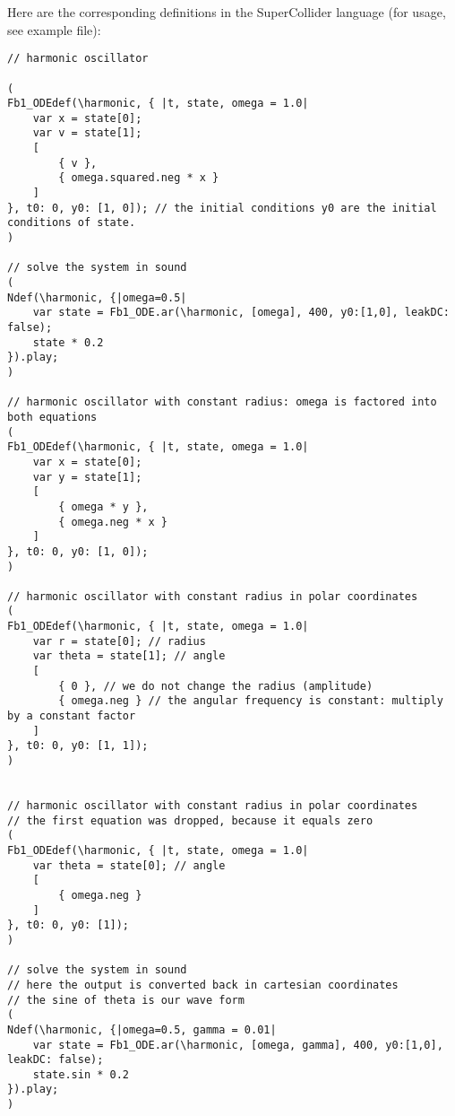 \documentclass{article}
\begin{document}
Here are the corresponding definitions in the SuperCollider language (for usage, see example file):

\begin{lstlisting}[caption=The symmetric oscillator and the oscillation on the circle.]
// harmonic oscillator

(
Fb1_ODEdef(\harmonic, { |t, state, omega = 1.0|
	var x = state[0];
	var v = state[1];
	[
		{ v },
		{ omega.squared.neg * x }
	]
}, t0: 0, y0: [1, 0]); // the initial conditions y0 are the initial conditions of state.
)

// solve the system in sound
(
Ndef(\harmonic, {|omega=0.5|
	var state = Fb1_ODE.ar(\harmonic, [omega], 400, y0:[1,0], leakDC: false);
	state * 0.2
}).play;
)

// harmonic oscillator with constant radius: omega is factored into both equations
(
Fb1_ODEdef(\harmonic, { |t, state, omega = 1.0|
	var x = state[0];
	var y = state[1];
	[
		{ omega * y },
		{ omega.neg * x }
	]
}, t0: 0, y0: [1, 0]);
)

// harmonic oscillator with constant radius in polar coordinates
(
Fb1_ODEdef(\harmonic, { |t, state, omega = 1.0|
	var r = state[0]; // radius
	var theta = state[1]; // angle
	[
		{ 0 }, // we do not change the radius (amplitude)
		{ omega.neg } // the angular frequency is constant: multiply by a constant factor
	]
}, t0: 0, y0: [1, 1]);
)


// harmonic oscillator with constant radius in polar coordinates
// the first equation was dropped, because it equals zero
(
Fb1_ODEdef(\harmonic, { |t, state, omega = 1.0|
	var theta = state[0]; // angle
	[
		{ omega.neg }
	]
}, t0: 0, y0: [1]);
)

// solve the system in sound
// here the output is converted back in cartesian coordinates
// the sine of theta is our wave form
(
Ndef(\harmonic, {|omega=0.5, gamma = 0.01|
	var state = Fb1_ODE.ar(\harmonic, [omega, gamma], 400, y0:[1,0], leakDC: false);
	state.sin * 0.2 
}).play;
)


\end{lstlisting}
\end{document}
